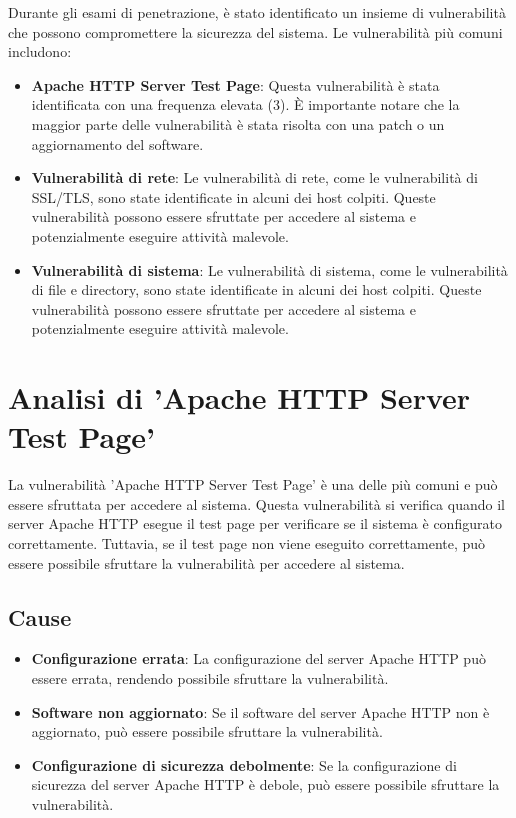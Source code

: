 Durante gli esami di penetrazione, è stato identificato un insieme di vulnerabilità che possono compromettere la sicurezza del sistema. Le vulnerabilità più comuni includono:
\begin{itemize}
\item \textbf{Apache HTTP Server Test Page}: Questa vulnerabilità è stata identificata con una frequenza elevata (3). È importante notare che la maggior parte delle vulnerabilità è stata risolta con una patch o un aggiornamento del software.
\item \textbf{Vulnerabilità di rete}: Le vulnerabilità di rete, come le vulnerabilità di SSL/TLS, sono state identificate in alcuni dei host colpiti. Queste vulnerabilità possono essere sfruttate per accedere al sistema e potenzialmente eseguire attività malevole.
\item \textbf{Vulnerabilità di sistema}: Le vulnerabilità di sistema, come le vulnerabilità di file e directory, sono state identificate in alcuni dei host colpiti. Queste vulnerabilità possono essere sfruttate per accedere al sistema e potenzialmente eseguire attività malevole.
\end{itemize}
\section{Analisi di 'Apache HTTP Server Test Page'}

La vulnerabilità 'Apache HTTP Server Test Page' è una delle più comuni e può essere sfruttata per accedere al sistema. Questa vulnerabilità si verifica quando il server Apache HTTP esegue il test page per verificare se il sistema è configurato correttamente. Tuttavia, se il test page non viene eseguito correttamente, può essere possibile sfruttare la vulnerabilità per accedere al sistema.

\subsection{Cause}
\begin{itemize}
\item \textbf{Configurazione errata}: La configurazione del server Apache HTTP può essere errata, rendendo possibile sfruttare la vulnerabilità.
\item \textbf{Software non aggiornato}: Se il software del server Apache HTTP non è aggiornato, può essere possibile sfruttare la vulnerabilità.
\item \textbf{Configurazione di sicurezza debolmente}: Se la configurazione di sicurezza del server Apache HTTP è debole, può essere possibile sfruttare la vulnerabilità.
\end{itemize}
